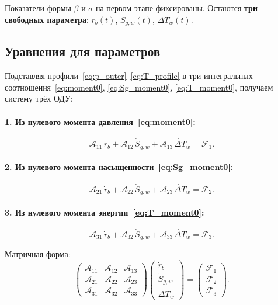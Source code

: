 \documentclass[12pt,a4paper]{article}
\begin{document}
Показатели формы $\beta$ и $\sigma$ на первом этапе фиксированы.
Остаются \textbf{три свободных параметра}:
$r_b(t)$, $S_{g,w}(t)$, $\Delta T_w(t)$.

\subsection{Уравнения для параметров}

Подставляя профили~\eqref{eq:p_outer}--\eqref{eq:T_profile}
в три интегральных соотношения~\eqref{eq:moment0},
\eqref{eq:Sg_moment0}, \eqref{eq:T_moment0},
получаем систему трёх ОДУ:

\paragraph{1. Из нулевого момента давления~\eqref{eq:moment0}:}
\begin{equation}\label{eq:ode1}
  \mathcal{A}_{11}\,\dot{r}_b
  + \mathcal{A}_{12}\,\dot{S}_{g,w}
  + \mathcal{A}_{13}\,\dot{\Delta T}_w
  = \mathcal{F}_1.
\end{equation}

\paragraph{2. Из нулевого момента насыщенности~\eqref{eq:Sg_moment0}:}
\begin{equation}\label{eq:ode2}
  \mathcal{A}_{21}\,\dot{r}_b
  + \mathcal{A}_{22}\,\dot{S}_{g,w}
  + \mathcal{A}_{23}\,\dot{\Delta T}_w
  = \mathcal{F}_2.
\end{equation}

\paragraph{3. Из нулевого момента энергии~\eqref{eq:T_moment0}:}
\begin{equation}\label{eq:ode3}
  \mathcal{A}_{31}\,\dot{r}_b
  + \mathcal{A}_{32}\,\dot{S}_{g,w}
  + \mathcal{A}_{33}\,\dot{\Delta T}_w
  = \mathcal{F}_3.
\end{equation}

Матричная форма:
\begin{equation}\label{eq:ode_system}
  \boxed{
    \begin{pmatrix}
      \mathcal{A}_{11} & \mathcal{A}_{12} & \mathcal{A}_{13} \\
      \mathcal{A}_{21} & \mathcal{A}_{22} & \mathcal{A}_{23} \\
      \mathcal{A}_{31} & \mathcal{A}_{32} & \mathcal{A}_{33}
    \end{pmatrix}
    \begin{pmatrix}
      \dot{r}_b \\ \dot{S}_{g,w} \\ \dot{\Delta T}_w
    \end{pmatrix}
    =
    \begin{pmatrix}
      \mathcal{F}_1 \\ \mathcal{F}_2 \\ \mathcal{F}_3
    \end{pmatrix}.
  }
\end{equation}
\end{document}
